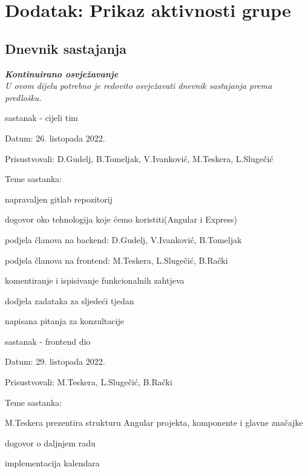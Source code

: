 \chapter*{Dodatak: Prikaz aktivnosti grupe}
		
		\section*{Dnevnik sastajanja}
		
		\textbf{\textit{Kontinuirano osvježavanje}}\\
		
		 \textit{U ovom dijelu potrebno je redovito osvježavati dnevnik sastajanja prema predlošku.}
		
		\begin{packed_enum}
			\item  sastanak - cijeli tim
			\item[] \begin{packed_item}
				\item Datum: 26. listopada 2022.
				\item Prisustvovali: D.Gudelj, B.Tomeljak, V.Ivanković, M.Teskera, L.Slugečić
				\item Teme sastanka:
				\begin{packed_item}
					\item  napravaljen gitlab repozitorij
					\item  dogovor oko tehnologija koje ćemo koristiti(Angular i Express)
					\item podjela članova na backend: D.Gudelj, V.Ivanković, B.Tomeljak
					\item podjela članova na frontend: M.Teskera, L.Slugečić, B.Rački
					\item komentiranje i ispisivanje funkcionalnih zahtjeva
					\item dodjela zadataka za sljedeći tjedan
					\item napisana pitanja za konzultacije
				\end{packed_item}
			\end{packed_item}
			
			\item  sastanak - frontend dio
			\item[] \begin{packed_item}
				\item Datum: 29. listopada 2022.
				\item Prisustvovali: M.Teskera, L.Slugečić, B.Rački
				\item Teme sastanka:
				\begin{packed_item}
					\item M.Teskera prezentira strukturu Angular projekta, komponente i glavne značajke
					\item dogovor o daljnjem radu
					\item implementacija kalendara
				\end{packed_item}
			\end{packed_item}
			

\end{packed_enum}

